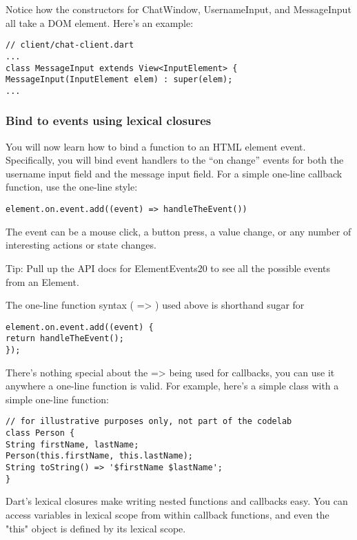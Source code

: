 Notice how the constructors for ChatWindow, UsernameInput, and MessageInput all take a DOM element. Here’s an example:

\begin{verbatim}
// client/chat-client.dart
...
class MessageInput extends View<InputElement> {
MessageInput(InputElement elem) : super(elem);
...
\end{verbatim}

\subsubsection{Bind to events using lexical closures}

You will now learn how to bind a function to an HTML element event. Specifically, you will bind event handlers to the “on change” events for both the username input field and the message input field.
For a simple one-line callback function, use the one-line style:

\begin{verbatim}
element.on.event.add((event) => handleTheEvent())
\end{verbatim}

The event can be a mouse click, a button press, a value change, or any number of interesting actions or state changes.

Tip: Pull up the API docs for ElementEvents20 to see all the possible events from an Element.

The one-line function syntax ( => ) used above is shorthand sugar for

\begin{verbatim}
element.on.event.add((event) {
return handleTheEvent();
});
\end{verbatim}

There’s nothing special about the => being used for callbacks, you can use it anywhere a one-line function is valid. For example, here’s a simple class with a simple one-line function:

\begin{verbatim}
// for illustrative purposes only, not part of the codelab
class Person {
String firstName, lastName;
Person(this.firstName, this.lastName);
String toString() => '$firstName $lastName';
}
\end{verbatim}

Dart’s lexical closures make writing nested functions and callbacks easy. You can access variables in lexical scope from within callback functions, and even the "this" object is defined by its lexical scope.

